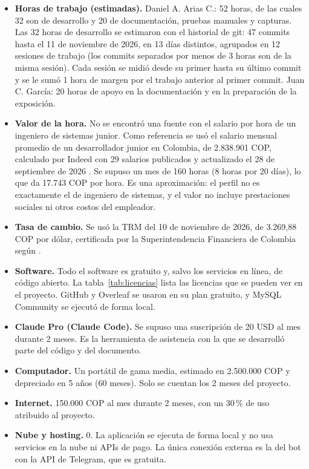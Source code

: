 \documentclass[journal,onecolumn,12pt,draftclsnofoot]{IEEEtran}
\begin{document}
\begin{itemize}
  \item \textbf{Horas de trabajo (estimadas).} Daniel A. Arias C.: 52 horas, de las cuales 32 son de desarrollo y 20 de documentación, pruebas manuales y capturas. Las 32 horas de desarrollo se estimaron con el historial de git: 47 commits hasta el 11 de noviembre de 2026, en 13 días distintos, agrupados en 12 sesiones de trabajo (los commits separados por menos de 3 horas son de la misma sesión). Cada sesión se midió desde su primer hasta su último commit y se le sumó 1 hora de margen por el trabajo anterior al primer commit. Juan C. García: 20 horas de apoyo en la documentación y en la preparación de la exposición.
  \item \textbf{Valor de la hora.} No se encontró una fuente con el salario por hora de un ingeniero de sistemas junior. Como referencia se usó el salario mensual promedio de un desarrollador junior en Colombia, de 2.838.901 COP, calculado por Indeed con 29 salarios publicados y actualizado el 28 de septiembre de 2026 \cite{indeed}. Se supuso un mes de 160 horas (8 horas por 20 días), lo que da 17.743 COP por hora. Es una aproximación: el perfil no es exactamente el de ingeniero de sistemas, y el valor no incluye prestaciones sociales ni otros costos del empleador.
  \item \textbf{Tasa de cambio.} Se usó la TRM del 10 de noviembre de 2026, de 3.269,88 COP por dólar, certificada por la Superintendencia Financiera de Colombia según \cite{diariodelsur}.
  \item \textbf{Software.} Todo el software es gratuito y, salvo los servicios en línea, de código abierto. La tabla~\ref{tab:licencias} lista las licencias que se pueden ver en el proyecto. GitHub y Overleaf se usaron en su plan gratuito, y MySQL Community se ejecutó de forma local.
  \item \textbf{Claude Pro (Claude Code).} Se supuso una suscripción de 20 USD al mes durante 2 meses. Es la herramienta de asistencia con la que se desarrolló parte del código y del documento.
  \item \textbf{Computador.} Un portátil de gama media, estimado en 2.500.000 COP y depreciado en 5 años (60 meses). Solo se cuentan los 2 meses del proyecto.
  \item \textbf{Internet.} 150.000 COP al mes durante 2 meses, con un 30\,\% de uso atribuido al proyecto.
  \item \textbf{Nube y hosting.} 0. La aplicación se ejecuta de forma local y no usa servicios en la nube ni APIs de pago. La única conexión externa es la del bot con la API de Telegram, que es gratuita.
\end{itemize}
\end{document}
